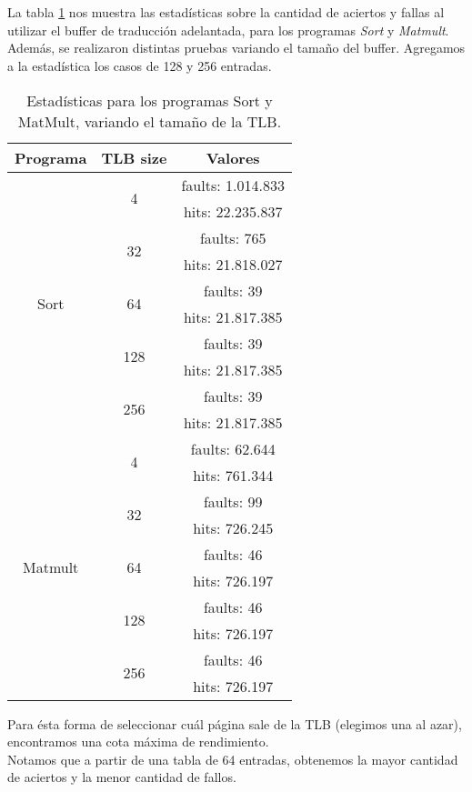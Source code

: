 \section{}
La tabla \ref{tab:practica04:statics} nos muestra las estadísticas sobre la cantidad de aciertos y fallas al utilizar el buffer de traducción adelantada, para los programas \textit{Sort} y \textit{Matmult}. Además, se realizaron distintas pruebas variando el tamaño del buffer. Agregamos a la estadística los casos de 128 y 256 entradas.\\
\begin{table}[!ht]
	\center
	\begin{tabular}{|c|c|c|}
		\hline
		\rowcolor{gray!50}
		Programa					&	TLB size			& Valores			\\	\hline
		\multirow{10}{*}{Sort}		&	\multirow{2}{*}{4}	& faults: 1.014.833	\\
									&						& hits: 22.235.837	\\
									&	\multirow{2}{*}{32}	& faults: 765		\\
									&						& hits: 21.818.027	\\
									&	\multirow{2}{*}{64}	& faults: 39		\\
									&						& hits: 21.817.385	\\
									&	\multirow{2}{*}{128}& faults: 39		\\
									&						& hits: 21.817.385	\\
									&	\multirow{2}{*}{256}& faults: 39		\\
									&						& hits: 21.817.385	\\ 	\hline
		\multirow{10}{*}{Matmult}	&	\multirow{2}{*}{4}	& faults: 62.644	\\
									&						& hits:	761.344		\\
									&	\multirow{2}{*}{32}	& faults: 99		\\
									&						& hits: 726.245		\\
									&	\multirow{2}{*}{64}	& faults: 46		\\
									&						& hits: 726.197		\\
									&	\multirow{2}{*}{128}& faults: 46		\\
									&						& hits: 726.197		\\
									&	\multirow{2}{*}{256}& faults: 46		\\
									&						& hits: 726.197		\\ 	\hline

	\end{tabular}
	\caption{Estadísticas para los programas Sort y MatMult, variando el tamaño de la TLB.}
	\label{tab:practica04:statics}
\end{table}
Para ésta forma de seleccionar cuál página sale de la TLB (elegimos una al azar), encontramos una cota máxima de rendimiento.\\
Notamos que a partir de una tabla de 64 entradas, obtenemos la mayor cantidad de aciertos y la menor cantidad de fallos.\\